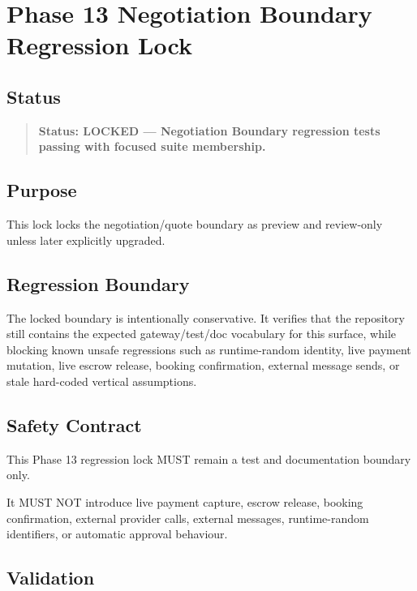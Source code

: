 \section{Phase 13 Negotiation Boundary Regression Lock}
\label{sec:phase13-negotiation-boundary-regression-lock}

\subsection{Status}

\begin{quote}
\textbf{Status: LOCKED --- Negotiation Boundary regression tests passing with focused suite membership.}
\end{quote}

\subsection{Purpose}

This lock locks the negotiation/quote boundary as preview and review-only unless later explicitly upgraded.

\subsection{Regression Boundary}

The locked boundary is intentionally conservative. It verifies that the repository still contains the expected gateway/test/doc vocabulary for this surface, while blocking known unsafe regressions such as runtime-random identity, live payment mutation, live escrow release, booking confirmation, external message sends, or stale hard-coded vertical assumptions.

\subsection{Safety Contract}

This Phase 13 regression lock MUST remain a test and documentation boundary only.

It MUST NOT introduce live payment capture, escrow release, booking confirmation, external provider calls, external messages, runtime-random identifiers, or automatic approval behaviour.

\subsection{Validation}

